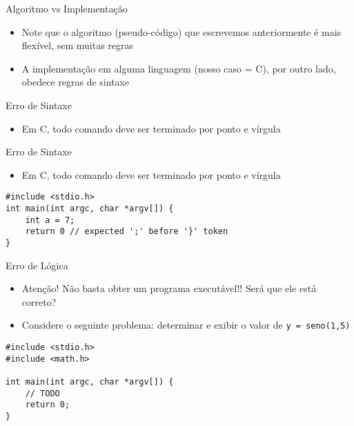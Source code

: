 \documentclass[t, aspectratio=169]{beamer}
\begin{document}
\begin{frame}[label={sec:orgf6fca31}]{Algoritmo vs Implementação}
\begin{itemize}
\item Note que o algoritmo (pseudo-código) que escrevemos anteriormente é mais
flexível, sem muitas regras
\item A implementação em alguma linguagem (nosso caso = C), por outro lado, obedece
\alert{regras de sintaxe}
\end{itemize}
\end{frame}

\begin{frame}[label={sec:org8273691}]{Erro de Sintaxe}
\begin{itemize}
\item Em C, todo comando deve ser terminado por ponto e vírgula
\end{itemize}
\end{frame}

\begin{frame}[label={sec:orgcc6749b},fragile]{Erro de Sintaxe}
 \begin{itemize}
\item Em C, todo comando deve ser terminado por ponto e vírgula
\end{itemize}

\begin{verbatim}
#include <stdio.h>
int main(int argc, char *argv[]) {
    int a = 7;
    return 0 // expected ';' before '}' token
}
\end{verbatim}
\end{frame}

\begin{frame}[label={sec:org90965ab},fragile]{Erro de Lógica}
 \begin{itemize}
\item \alert{Atenção!} Não basta obter um programa executável!! Será que ele está correto?
\item Considere o seguinte problema: determinar e exibir o valor de \texttt{y = seno(1,5)}
\end{itemize}
\begin{verbatim}
#include <stdio.h>
#include <math.h>

int main(int argc, char *argv[]) {
    // TODO
    return 0;
}
\end{verbatim}
\end{frame}
\end{document}
